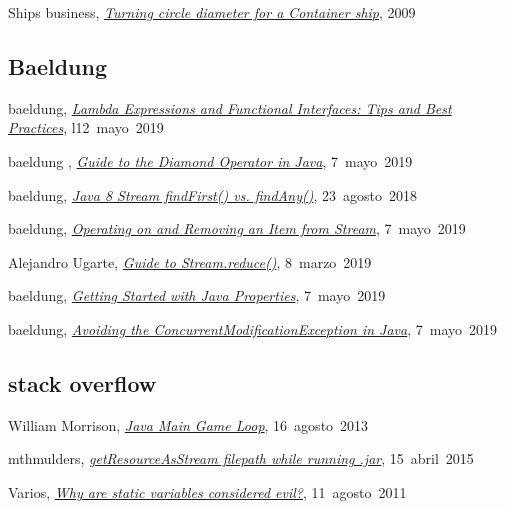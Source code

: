 Ships business,
\href{http://shipsbusiness.com/turning-circle.html}{\textit{Turning circle diameter for a Container ship}},
\mbox{2009}

\subsection*{Baeldung}

baeldung,
\href{https://www.baeldung.com/java-8-lambda-expressions-tips}{\textit{Lambda Expressions and Functional Interfaces: Tips and Best Practices}},
\mbox{l12 mayo 2019}

 baeldung ,
\href{https://www.baeldung.com/java-diamond-operator}{\textit{Guide to the Diamond Operator in Java}},
\mbox{7 mayo 2019}

baeldung,
\href{https://www.baeldung.com/java-stream-findfirst-vs-findany}{\textit{Java 8 Stream findFirst() vs. findAny()}},
\mbox{23 agosto 2018}

baeldung,
\href{https://www.baeldung.com/java-use-remove-item-stream}{\textit{Operating on and Removing an Item from Stream}},
\mbox{7 mayo 2019}

Alejandro Ugarte,
\href{https://www.baeldung.com/java-stream-reduce}{\textit{Guide to Stream.reduce()}},
\mbox{8 marzo 2019}

 baeldung,
\href{https://www.baeldung.com/java-properties}{\textit{Getting Started with Java Properties}},
\mbox{7 mayo 2019}

baeldung,
\href{https://www.baeldung.com/java-concurrentmodificationexception}{\textit{Avoiding the ConcurrentModificationException in Java}},
\mbox{7 mayo 2019}

\subsection*{stack overflow}

William Morrison,
\href{https://stackoverflow.com/a/18283279}{\textit{Java Main Game Loop}},
\mbox{16 agosto 2013}

mthmulders,
\href{https://stackoverflow.com/a/16010612}{\textit{getResourceAsStream filepath while running .jar}},
\mbox{15 abril 2015}

Varios,
\href{https://stackoverflow.com/questions/7026507/why-are-static-variables-considered-evil}{\textit{Why are static variables considered evil?}},
\mbox{11 agosto 2011}

